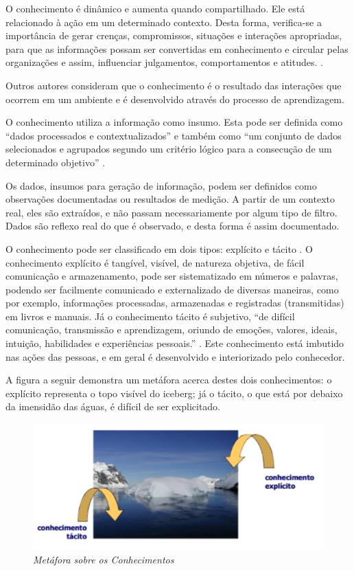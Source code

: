 O conhecimento é dinâmico e aumenta quando compartilhado. Ele está relacionado à ação em um determinado contexto. Desta forma, verifica-se a importância de gerar crenças, compromissos, situações e interações apropriadas, para que as informações possam ser convertidas em conhecimento e circular pelas organizações e assim, influenciar julgamentos, comportamentos e atitudes. \cite{nonaka}.

Outros autores \cite{fleury} consideram que o conhecimento é o resultado das interações que ocorrem em um ambiente e é desenvolvido através do processo de aprendizagem.

O conhecimento utiliza a informação como insumo. Esta pode ser definida como “dados processados e contextualizados” e também como “um conjunto de dados selecionados e agrupados segundo um critério lógico para a consecução de um determinado objetivo” \cite{angeloni}.

Os dados, insumos para geração de informação, podem ser definidos como observações documentadas ou resultados de medição. A partir de um contexto real, eles são extraídos, e não passam necessariamente por algum tipo de filtro. Dados são reflexo real do que é observado, e desta forma é assim documentado.

O conhecimento pode ser classificado em dois tipos: explícito e tácito \cite{nonaka}. O conhecimento explícito é tangível, visível, de natureza objetiva, de fácil comunicação e armazenamento, pode ser sistematizado em números e palavras, podendo ser facilmente comunicado e externalizado de diversas maneiras, como por exemplo, informações processadas, armazenadas e registradas (transmitidas) em livros e  manuais. Já o conhecimento tácito é subjetivo, “de difícil comunicação, transmissão e aprendizagem, oriundo de emoções, valores, ideais, intuição, habilidades e experiências pessoais.” \cite{nadai}. Este conhecimento está imbutido nas ações das pessoas, e em geral é desenvolvido e interiorizado pelo conhecedor.

A figura a seguir demonstra um metáfora acerca destes dois conhecimentos: o explícito representa o topo visível do iceberg; já o tácito, o que está por debaixo da imensidão das águas, é difícil de ser explicitado.

\begin{figure}[H]
\centering\includegraphics[scale=0.5]{figuras/tacitoExplicito.png}
\caption{\textit{Metáfora sobre os Conhecimentos}}
\end{figure}

